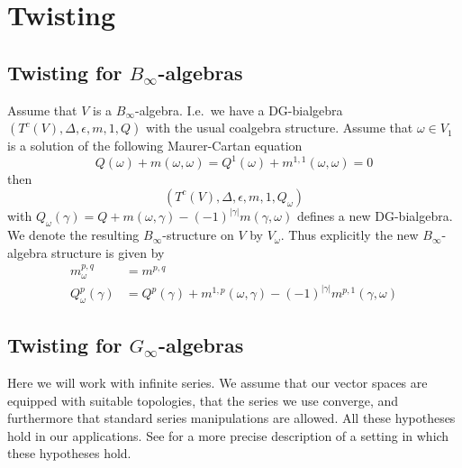 \documentclass{amsart}
\numberwithin{equation}{section}
\theoremstyle{definition}
\theoremstyle{remark}
\begin{document}
\section{Twisting}

\subsection{Twisting for $B_\infty$-algebras}

Assume that $V$ is a $B_\infty$-algebra. I.e.\ we have a DG-bialgebra
$(T^c(V),\Delta,\epsilon,m,1,Q)$ with the usual coalgebra structure. Assume
that $\omega\in V_1$ is a solution of the following Maurer-Cartan equation
\[
Q(\omega)+m(\omega,\omega)=Q^1(\omega)+m^{1,1}(\omega,\omega)=0
\]
then 
\[
(T^c(V),\Delta,\epsilon,m,1,Q_\omega)
\]
with
$Q_\omega(\gamma)=Q+m(\omega,\gamma)-(-1)^{|\gamma|}m(\gamma,\omega)$ defines a new DG-bialgebra. 
We denote the resulting 
$B_\infty$-structure on $V$ by $V_\omega$. Thus explicitly the new $B_\infty$-algebra structure 
is given by
\begin{equation}\label{ref-6.1-13}
\begin{split}
m_\omega^{p,q}&=m^{p,q}\\
Q^p_\omega(\gamma)&=Q^p(\gamma)+m^{1,p}(\omega,\gamma)-(-1)^{|\gamma|}m^{p,1}(\gamma,\omega)
\end{split}
\end{equation}

\subsection{Twisting for $G_\infty$-algebras}
\label{ref-6.2-14}

Here we will work with infinite series. We assume that our vector
spaces are equipped with suitable topologies, that the series we use
converge, and furthermore that standard series manipulations are
allowed. All these hypotheses hold in our applications.
See \cite[\S4, \S6.2]{vdbcalaque} for a more precise
description of a setting in which these hypotheses hold.
\end{document}
